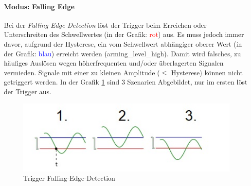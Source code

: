 \paragraph{Modus: Falling Edge}
Bei der \textit{Falling-Edge-Detection} löst der Trigger beim Erreichen oder Unterschreiten des Schwellwertes (in der Grafik: \textcolor{red}{rot}) aus. Es muss jedoch immer davor, aufgrund der Hysterese, ein vom Schwellwert abhängiger oberer Wert (in der Grafik: \textcolor{blue}{blau}) erreicht werden (arming\_level\_high). Damit wird falsches, zu häufiges Auslösen wegen höherfrequenten und/oder überlagerten Signalen vermieden. Signale mit einer zu kleinen Amplitude ($\leq$ Hysterese) können nicht getriggert werden. In der Grafik \ref{fallingEdge} sind 3 Szenarien Abgebildet, nur im ersten löst der Trigger aus.
\begin{figure}[h]
	\begin{center}
		\includegraphics[width=15cm]{SAUER/Grafiken/Trigger/TriggerEdgeFalling.jpg}
		\caption{Trigger Falling-Edge-Detection}
		\label{fallingEdge}
	\end{center}
\end{figure}
